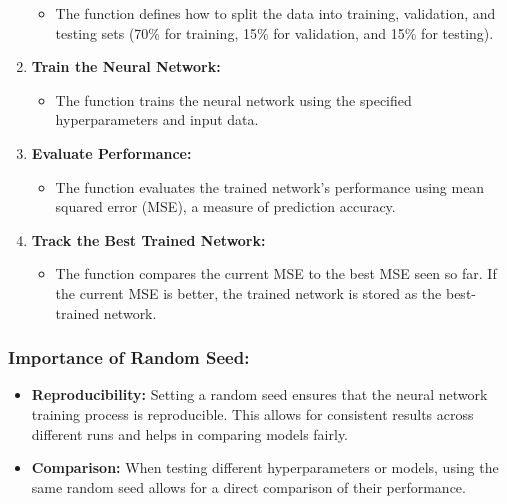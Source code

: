 \documentclass[
  super,
  review,
  3p]{elsarticle}
\providecommand{\tightlist}{%
  \setlength{\itemsep}{0pt}\setlength{\parskip}{0pt}}\usepackage{longtable,booktabs,array}
\begin{document}
\begin{enumerate}
  \begin{itemize}
  \tightlist
  \item
    The function defines how to split the data into training,
    validation, and testing sets (70\% for training, 15\% for
    validation, and 15\% for testing).
  \end{itemize}
\item
  \textbf{Train the Neural Network:}

  \begin{itemize}
  \tightlist
  \item
    The function trains the neural network using the specified
    hyperparameters and input data.
  \end{itemize}
\item
  \textbf{Evaluate Performance:}

  \begin{itemize}
  \tightlist
  \item
    The function evaluates the trained network's performance using mean
    squared error (MSE), a measure of prediction accuracy.
  \end{itemize}
\item
  \textbf{Track the Best Trained Network:}

  \begin{itemize}
  \tightlist
  \item
    The function compares the current MSE to the best MSE seen so far.
    If the current MSE is better, the trained network is stored as the
    best-trained network.
  \end{itemize}
\end{enumerate}

\subsubsection{Importance of Random
Seed:}\label{importance-of-random-seed-1}

\begin{itemize}
\tightlist
\item
  \textbf{Reproducibility:} Setting a random seed ensures that the
  neural network training process is reproducible. This allows for
  consistent results across different runs and helps in comparing models
  fairly.
\item
  \textbf{Comparison:} When testing different hyperparameters or models,
  using the same random seed allows for a direct comparison of their
  performance.
\end{itemize}
\end{document}
